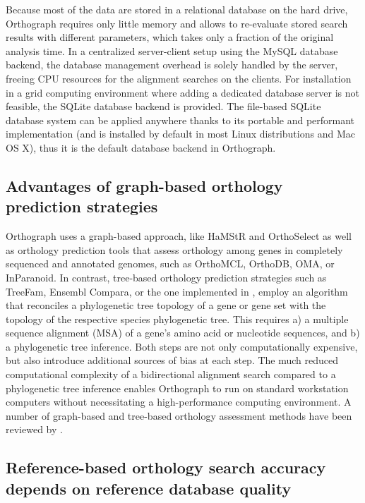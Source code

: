 Because most of the data are stored in a relational database on the hard
drive, Orthograph requires only little memory and allows to re-evaluate
stored search results with different parameters, which takes only a
fraction of the original analysis time. In a centralized server-client
setup using the MySQL database backend, the database management overhead
is solely handled by the server, freeing CPU resources for the alignment
searches on the clients. For installation in a grid computing
environment where adding a dedicated database server is not feasible,
the SQLite database backend \cite{Hipp2016} is provided. The file-based
SQLite database system can be applied anywhere thanks to its portable
and performant implementation (and is installed by default in most Linux
distributions and Mac OS X), thus it is the default database backend in
Orthograph.

\subsection{Advantages of graph-based orthology prediction
strategies}\label{advantages-of-graph-based-orthology-prediction-strategies}

Orthograph uses a graph-based approach, like HaMStR and OrthoSelect as
well as orthology prediction tools that assess orthology among genes in
completely sequenced and annotated genomes, such as OrthoMCL, OrthoDB,
OMA, or InParanoid. In contrast, tree-based orthology prediction
strategies such as TreeFam, Ensembl Compara, or the one implemented in
\cite{Capella-Gutierrez2014}, employ an algorithm that reconciles a
phylogenetic tree topology of a gene or gene set with the topology of
the respective species phylogenetic tree. This requires a) a multiple
sequence alignment (MSA) of a gene's amino acid or nucleotide sequences,
and b) a phylogenetic tree inference. Both steps are not only
computationally expensive, but also introduce additional sources of bias
at each step. The much reduced computational complexity of a
bidirectional alignment search compared to a phylogenetic tree inference
enables Orthograph to run on standard workstation computers without
necessitating a high-performance computing environment. A number of
graph-based and tree-based orthology assessment methods have been
reviewed by \cite{Trachana2011}.

\subsection{Reference-based orthology search accuracy depends on
reference database
quality}\label{reference-based-orthology-search-accuracy-depends-on-reference-database-quality}

